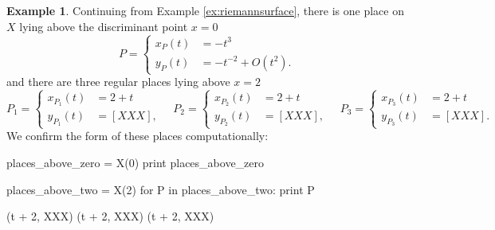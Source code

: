 \documentclass[12pt]{article}
\theoremstyle{definition}
\newtheorem{example}[theorem]{Example}
\begin{document}
\begin{example} \label{ex:places} %
Continuing from Example \ref{ex:riemannsurface}, there is one place on
$X$ lying above the discriminant point $x=0$
\begin{equation}
  P =
  \begin{cases}
    x_{P}(t) &= -t^3 \\
    y_{P}(t) &= -t^{-2} + O\left( t^2 \right).
  \end{cases}
\end{equation}
and there are three regular places lying above $x=2$
\begin{equation}
  P_1 =
  \begin{cases}
    x_{P_1}(t) &= 2 + t \\
    y_{P_1}(t) &= [XXX],
  \end{cases} \quad
  P_2 =
  \begin{cases}
    x_{P_2}(t) &= 2 + t \\
    y_{P_2}(t) &= [XXX],
  \end{cases} \quad
  P_3 =
  \begin{cases}
    x_{P_3}(t) &= 2 + t \\
    y_{P_3}(t) &= [XXX].
  \end{cases}
\end{equation}
We confirm the form of these places computationally:
\begin{ipythoninput}
places_above_zero = X(0)
print places_above_zero
\end{ipythoninput}
\begin{ipythonoutput}
[(-t**3, -1/t**2 + O(t**2))]
\end{ipythonoutput}
\begin{ipythoninput}
places_above_two = X(2)
for P in places_above_two:
    print P
\end{ipythoninput}
\begin{ipythonoutput}
(t + 2, XXX)
(t + 2, XXX)
(t + 2, XXX)
\end{ipythonoutput}

\end{example}
\end{document}
